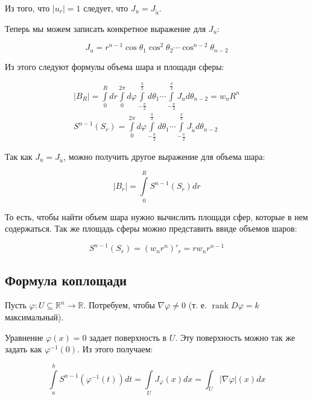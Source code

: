 \documentclass[a5paper]{article}
\theoremstyle{plain}
\theoremstyle{definition}
\numberwithin{through}{section}
\numberwithin{equation}{section}
\DeclareMathOperator{\rank}{rank}
\begin{document}
Из того, что $|u_r|=1$ следует, что $J_u = J_{\tilde{u}}$.

Теперь мы можем записать конкретное выражение для $J_u$:

\begin{equation*}
	J_u = r^{n-1} \cos \theta_1 \cos^2 \theta_2 \cdots \cos^{n-2} \theta_{n-2}
\end{equation*}

Из этого следуют формулы объема шара и площади сферы:

\begin{align*}
	|B_R| = \int\limits_0^R dr \int\limits_{0}^{2\pi} d \varphi \int\limits_{-\frac{\pi}{2}}^{\frac{\pi}{2}} d \theta_1 \cdots \int\limits_{-\frac{\pi}{2}}^{\frac{\pi}{2}} J_u d \theta_{n-2} = w_n R^n \\
	S^{n-1}(S_r) = \int\limits_{0}^{2\pi} d \varphi \int\limits_{-\frac{\pi}{2}}^{\frac{\pi}{2}} d \theta_1 \cdots \int\limits_{-\frac{\pi}{2}}^{\frac{\pi}{2}} J_{\tilde{u}} d \theta_{n-2}
\end{align*}

Так как $J_u = J_{\tilde{u}}$, можно получить другое выражение для объема шара:

\begin{equation*}
	|B_r|=\int\limits_{0}^{R} S^{n-1}(S_r) dr
\end{equation*}

То есть, чтобы найти объем шара нужно вычислить площади сфер, которые в нем содержаться. Так же площадь сферы можно представить ввиде объемов шаров:

\begin{equation*}
	S^{n-1}(S_r) = (w_n r^n)'_r=r w_n r^{n-1}
\end{equation*}

\subsection{Формула коплощади} 

Пусть $\varphi : U \subseteq \mathbb{R}^n \to \mathbb{R}$. Потребуем, чтобы $\nabla \varphi \not= 0$ (т. е. $\rank D \varphi = k$ максимальный). 

Уравнение $\varphi(x) = 0$ задает поверхность в $U$. Эту поверхность можно так же задать как $\varphi^{-1}(0)$. Из этого получаем:

\begin{equation*}
	\int\limits_{a}^{b} S^{n-1}(\varphi^{-1}(t)) dt = \int\limits_{U}^{} J_{\varphi} (x) dx = \int_U |\nabla \varphi| (x) dx
\end{equation*}
\end{document}
